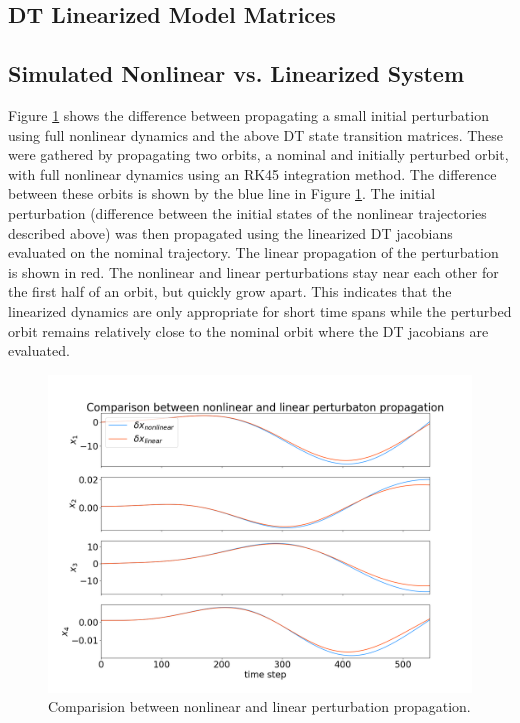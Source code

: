 \documentclass[11pt, a4paper]{article}
\begin{document}
\subsection{DT Linearized Model Matrices}


\subsection{Simulated Nonlinear vs. Linearized System}
Figure \ref{fig:nlvl_s} shows the difference between propagating a small initial perturbation using full nonlinear dynamics and the above DT state transition matrices. 
These were gathered by propagating two orbits, a nominal and initially perturbed orbit, with full nonlinear dynamics using an RK45 integration method.
The difference between these orbits is shown by the blue line in Figure \ref{fig:nlvl_s}. 
The initial perturbation (difference between the initial states of the nonlinear trajectories described above) was then propagated using the linearized DT jacobians evaluated on the nominal trajectory. 
The linear propagation of the perturbation is shown in red. 
The nonlinear and linear perturbations stay near each other for the first half of an orbit, but quickly grow apart.
This indicates that the linearized dynamics are only appropriate for short time spans while the perturbed orbit remains relatively close to the nominal orbit where the DT jacobians are evaluated. 

\begin{figure}[H]
	\centering
	\includegraphics[width=\textwidth]{./Figures/nonlvl_state.png}
	\caption{Comparision between nonlinear and linear perturbation propagation.}
	\label{fig:nlvl_s}
\end{figure}
\end{document}
